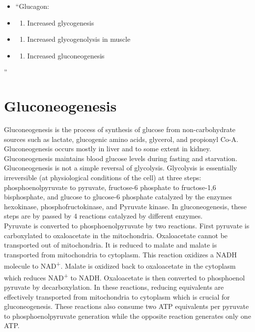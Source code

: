 \documentclass[
]{book}
\providecommand{\tightlist}{%
  \setlength{\itemsep}{0pt}\setlength{\parskip}{0pt}}
\begin{document}
\begin{itemize}
\item
  ``Glucagon:
\item
  \begin{enumerate}
  \def\labelenumi{(\Alph{enumi})}
  \tightlist
  \item
    Increased glycogenesis\\
  \end{enumerate}
\item
  \begin{enumerate}
  \def\labelenumi{(\Alph{enumi})}
  \setcounter{enumi}{1}
  \tightlist
  \item
    Increased glycogenolysis in muscle\\
  \end{enumerate}
\item
  \begin{enumerate}
  \def\labelenumi{(\Alph{enumi})}
  \setcounter{enumi}{2}
  \tightlist
  \item
    Increased gluconeogenesis
  \end{enumerate}
\end{itemize}

''

\chapter{Gluconeogenesis}\label{gluconeogenesis}

Gluconeogenesis is the process of synthesis of glucose from non-carbohydrate sources such as lactate, glucogenic amino acids, glycerol, and propionyl Co-A. Gluconeogenesis occurs mostly in liver and to some extent in kidney. Gluconeogenesis maintains blood glucose levels during fasting and starvation.\\

Gluconeogenesis is not a simple reversal of glycolysis. Glycolysis is essentially irreversible (at physiological conditions of the cell) at three steps: phosphoenolpyruvate to pyruvate, fructose-6 phosphate to fructose-1,6 bisphosphate, and glucose to glucose-6 phosphate catalyzed by the enzymes hexokinase, phosphofructokinase, and Pyruvate kinase. In gluconeogenesis, these steps are by passed by 4 reactions catalyzed by different enzymes.\\

Pyruvate is converted to phosphoenolpyruvate by two reactions. First pyruvate is carboxylated to oxaloacetate in the mitochondria. Oxaloacetate cannot be transported out of mitochondria. It is reduced to malate and malate is transported from mitochondria to cytoplasm. This reaction oxidizes a NADH molecule to NAD\textsuperscript{+}. Malate is oxidized back to oxaloacetate in the cytoplasm which reduces NAD\textsuperscript{+} to NADH. Oxaloacetate is then converted to phosphoenol pyruvate by decarboxylation. In these reactions, reducing equivalents are effectively transported from mitochondria to cytoplasm which is crucial for gluconeogenesis. These reactions also consume two ATP equivalents per pyruvate to phosphoenolpyruvate generation while the opposite reaction generates only one ATP.\\
\end{document}
